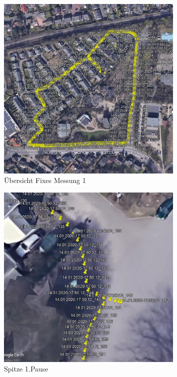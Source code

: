 \begin{figure}[h!]
    \centering
    \includegraphics[width=0.8\textwidth]{Route1}
    \caption{Übersicht Fixes Messung 1}
    \label{fig:map}
\end{figure}
\begin{figure}[h!]
    \centering
    \includegraphics[width=0.8\textwidth]{Route1_abweichung_pause_1}
    \caption{Spitze 1.Pause}
    \label{fig:map}
\end{figure}
